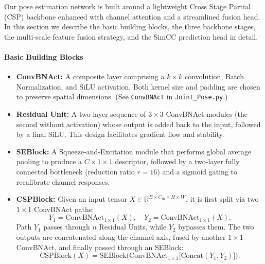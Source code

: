 
Our pose estimation network is built around a lightweight Cross Stage Partial (CSP) backbone enhanced with channel attention and a streamlined fusion head. In this section we describe the basic building blocks, the three backbone stages, the multi‐scale feature fusion strategy, and the SimCC prediction head in detail.

\paragraph{Basic Building Blocks}
\begin{itemize}
  \item \textbf{ConvBNAct:} A composite layer comprising a $k\times k$ convolution, Batch Normalization, and SiLU activation.  Both kernel size and padding are chosen to preserve spatial dimensions.  (See \texttt{ConvBNAct} in \texttt{Joint\_Pose.py}.)
  \item \textbf{Residual Unit:} A two‐layer sequence of $3\times3$ ConvBNAct modules (the second without activation) whose output is added back to the input, followed by a final SiLU.  This design facilitates gradient flow and stability.
  \item \textbf{SEBlock:} A Squeeze‐and‐Excitation module that performs global average pooling to produce a $C\times1\times1$ descriptor, followed by a two‐layer fully connected bottleneck (reduction ratio $r=16$) and a sigmoid gating to recalibrate channel responses.
  \item \textbf{CSPBlock:} Given an input tensor $X\in\mathbb{R}^{B\times C_{\mathrm{in}}\times H\times W}$, it is first split via two $1\times1$ ConvBNAct paths:
    \[
      Y_1 = \mathrm{ConvBNAct}_{1\times1}(X), \quad
      Y_2 = \mathrm{ConvBNAct}_{1\times1}(X).
    \]
    Path $Y_1$ passes through $n$ Residual Units, while $Y_2$ bypasses them.  The two outputs are concatenated along the channel axis, fused by another $1\times1$ ConvBNAct, and finally passed through an SEBlock:
    \[
      \mathrm{CSPBlock}(X) = \mathrm{SEBlock}\bigl(\mathrm{ConvBNAct}_{1\times1}\bigl[\mathrm{Concat}(Y_1, Y_2)\bigr]\bigr).
    \]
\end{itemize}

